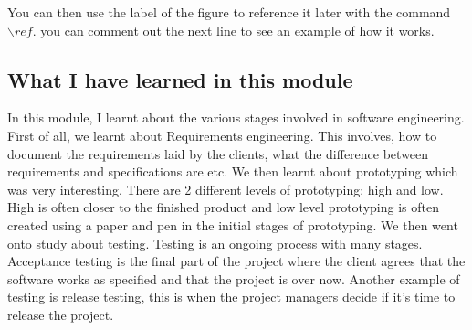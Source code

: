 You can then use the label of the figure to reference it later with the command ${\backslash}ref$. you can comment out the next line to see an example of how it works.


\subsection{What I have learned in this module}
In this module, I learnt about the various stages involved in software engineering. First of all, we learnt about Requirements engineering. This involves, how to document the requirements laid by the clients, what the difference between requirements and specifications are etc. We then learnt about prototyping which was very interesting. There are 2 different levels of prototyping; high and low. High is often closer to the finished product and low level prototyping is often created using a paper and pen in the initial stages of prototyping. We then went onto study about testing. Testing is an ongoing process with many stages. Acceptance testing is the final part of the project where  the client agrees that the software works as specified and that the project is over now. Another example of testing is release testing, this is when the project managers decide if it's time to release the project. 

